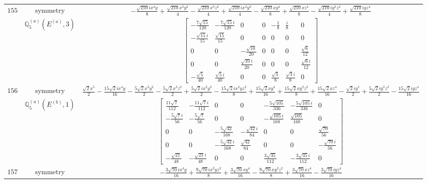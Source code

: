 \documentclass[fleqn,8pt,landscape]{jsarticle}
\begin{document}
\begin{longtable}{ccc}
$ 155 $ & $ \text{symmetry} $ & $ - \frac{\sqrt{210} i x^{4} y}{8} + \frac{\sqrt{210} x^{3} y^{2}}{4} - \frac{\sqrt{210} x^{3} z^{2}}{4} + \frac{\sqrt{210} i x^{2} y^{3}}{4} - \frac{\sqrt{210} x y^{4}}{8} + \frac{\sqrt{210} x z^{4}}{8} - \frac{\sqrt{210} i y^{3} z^{2}}{4} + \frac{\sqrt{210} i y z^{4}}{8} $ \\
$  $ & $ \mathbb{Q}_{5}^{(a)}(E^{(a)},3) $ & $ \begin{bmatrix} - \frac{7 \sqrt{15}}{120} & - \frac{7 \sqrt{15} i}{120} & 0 & 0 & - \frac{1}{8} & \frac{i}{8} & 0 \\ - \frac{\sqrt{15} i}{15} & \frac{\sqrt{15}}{15} & 0 & 0 & 0 & 0 & 0 \\ 0 & 0 & - \frac{\sqrt{10}}{20} & 0 & 0 & 0 & \frac{\sqrt{6}}{12} \\ 0 & 0 & \frac{\sqrt{10} i}{20} & 0 & 0 & 0 & \frac{\sqrt{6} i}{12} \\ - \frac{\sqrt{5}}{40} & \frac{\sqrt{5} i}{40} & 0 & 0 & \frac{\sqrt{3}}{8} & \frac{\sqrt{3} i}{8} & 0 \end{bmatrix} $ \\ \hline
$ 156 $ & $ \text{symmetry} $ & $ \frac{\sqrt{2} x^{5}}{2} - \frac{15 \sqrt{2} i x^{4} y}{16} - \frac{5 \sqrt{2} x^{3} y^{2}}{2} - \frac{5 \sqrt{2} x^{3} z^{2}}{2} + \frac{5 \sqrt{2} i x^{2} y^{3}}{2} - \frac{15 \sqrt{2} i x^{2} y z^{2}}{8} + \frac{15 \sqrt{2} x y^{4}}{16} + \frac{15 \sqrt{2} x y^{2} z^{2}}{8} + \frac{15 \sqrt{2} x z^{4}}{16} - \frac{\sqrt{2} i y^{5}}{2} + \frac{5 \sqrt{2} i y^{3} z^{2}}{2} - \frac{15 \sqrt{2} i y z^{4}}{16} $ \\
$  $ & $ \mathbb{Q}_{5}^{(a)}(E^{(b)},1) $ & $ \begin{bmatrix} \frac{11 \sqrt{7}}{112} & - \frac{11 \sqrt{7} i}{112} & 0 & 0 & - \frac{5 \sqrt{105}}{336} & - \frac{5 \sqrt{105} i}{336} & 0 \\ - \frac{5 \sqrt{7} i}{56} & - \frac{5 \sqrt{7}}{56} & 0 & 0 & - \frac{\sqrt{105} i}{168} & \frac{\sqrt{105}}{168} & 0 \\ 0 & 0 & - \frac{5 \sqrt{42}}{168} & - \frac{\sqrt{42} i}{84} & 0 & 0 & \frac{\sqrt{70}}{56} \\ 0 & 0 & - \frac{5 \sqrt{42} i}{168} & \frac{\sqrt{42}}{84} & 0 & 0 & - \frac{\sqrt{70} i}{56} \\ - \frac{\sqrt{21}}{48} & - \frac{\sqrt{21} i}{48} & 0 & 0 & \frac{3 \sqrt{35}}{112} & - \frac{3 \sqrt{35} i}{112} & 0 \end{bmatrix} $ \\ \hline
$ 157 $ & $ \text{symmetry} $ & $ - \frac{3 \sqrt{70} i x^{4} y}{16} + \frac{9 \sqrt{70} i x^{2} y z^{2}}{8} + \frac{3 \sqrt{70} x y^{4}}{16} - \frac{9 \sqrt{70} x y^{2} z^{2}}{8} + \frac{3 \sqrt{70} x z^{4}}{16} - \frac{3 \sqrt{70} i y z^{4}}{16} $ \\

\end{longtable}
\end{document}
